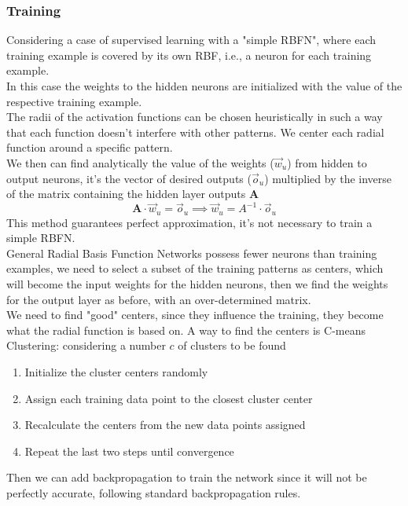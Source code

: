 \subsubsection{Training}
Considering a case of supervised learning with a "simple RBFN", where each training example is covered by its own RBF, i.e., a neuron for each training example. \\
In this case the weights to the hidden neurons are initialized with the value of the respective training example. \\
The radii of the activation functions can be chosen heuristically in such a way that each function doesn't interfere with other patterns. We center each radial function around a specific pattern.\\
We then can find analytically the value of the weights ($\vec{w}_u$) from hidden to output neurons, it's the vector of desired outputs ($\vec{o}_u$) multiplied by the inverse of the matrix containing the hidden layer outputs $\bm{A}$
$$ \bm{A} \cdot \vec{w}_u = \vec{o}_u \implies \vec{w}_u = A^{-1} \cdot \vec{o}_u $$
This method guarantees perfect approximation, it's not necessary to train a simple RBFN.\\

General Radial Basis Function Networks possess fewer neurons than training examples, we need to select a subset of the training patterns as centers, which will become the input weights for the hidden neurons, then we find the weights for the output layer as before, with an over-determined matrix.\\

\label{point:c-means}
We need to find "good" centers, since they influence the training, they become what the radial function is based on. A way to find the centers is C-means Clustering: considering  a number $c$ of clusters to be found
\begin{enumerate}
	\item Initialize the cluster centers randomly
	\item Assign each training data point to the closest cluster center
	\item Recalculate the centers from the new data points assigned 
	\item Repeat the last two steps until convergence
\end{enumerate}

Then we can add backpropagation to train the network since it will not be perfectly accurate, following standard backpropagation rules. \\

